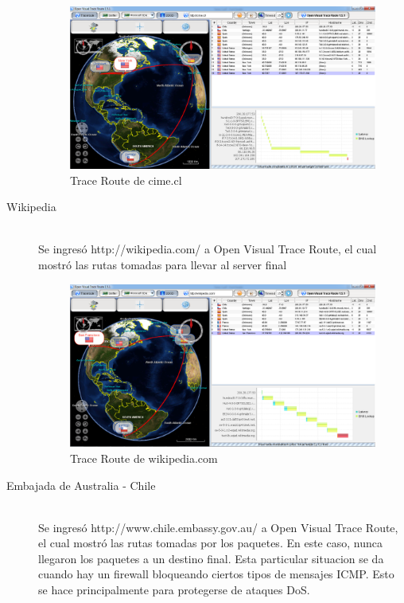 \documentclass{article}
\begin{document}
\begin{description}
\begin{figure}[h!]
\centering
\includegraphics[scale=0.30]{tracerouteCime.png}
\caption{Trace Route de cime.cl}
\label{fig:cime}
\end{figure}    

  
\item[Wikipedia] \hfill \\
Se ingresó http://wikipedia.com/ a Open Visual Trace Route, el cual mostró las rutas tomadas para llevar al server final

\begin{figure}[h!]
\centering
\includegraphics[scale=0.30]{tracerouteWikipedia.png}
\caption{Trace Route de wikipedia.com}
\label{fig:wikipedia}
\end{figure}    
  
  
\item[Embajada de Australia - Chile] \hfill \\
Se ingresó http://www.chile.embassy.gov.au/ a Open Visual Trace Route, el cual mostró las rutas tomadas por los paquetes. En este caso, nunca llegaron los paquetes a un destino final. Esta particular situacion se da cuando hay un firewall bloqueando ciertos tipos de mensajes ICMP. Esto se hace principalmente para protegerse de ataques DoS.


\end{description}
\end{document}
